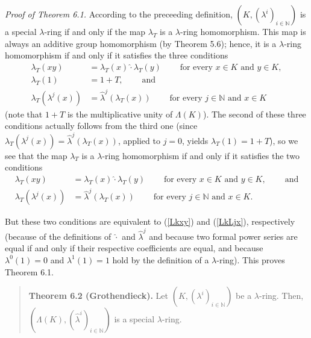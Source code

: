 \documentclass[12pt,final,notitlepage,onecolumn,german]{article}%
\begin{document}
\textit{Proof of Theorem 6.1.} According to the preceeding definition,
$\left(  K,\left(  \lambda^{i}\right)  _{i\in\mathbb{N}}\right)  $ is a
special $\lambda$-ring if and only if the map $\lambda_{T}$ is a $\lambda
$-ring homomorphism. This map is always an additive group homomorphism (by
Theorem 5.6); hence, it is a $\lambda$-ring homomorphism if and only if it
satisfies the three conditions%
\begin{align*}
\lambda_{T}\left(  xy\right)   &  =\lambda_{T}\left(  x\right)  \widehat
{\cdot}\lambda_{T}\left(  y\right)  \ \ \ \ \ \ \ \ \ \ \text{for every }x\in
K\text{ and }y\in K,\\
\lambda_{T}\left(  1\right)   &  =1+T,\ \ \ \ \ \ \ \ \ \ \text{and}\\
\lambda_{T}\left(  \lambda^{j}\left(  x\right)  \right)   &  =\widehat
{\lambda}^{j}\left(  \lambda_{T}\left(  x\right)  \right)
\ \ \ \ \ \ \ \ \ \ \text{for every }j\in\mathbb{N}\text{ and }x\in K
\end{align*}
(note that $1+T$ is the multiplicative unity of $\Lambda\left(  K\right)  $).
The second of these three conditions actually follows from the third one
(since $\lambda_{T}\left(  \lambda^{j}\left(  x\right)  \right)
=\widehat{\lambda}^{j}\left(  \lambda_{T}\left(  x\right)  \right)  $, applied
to $j=0$, yields $\lambda_{T}\left(  1\right)  =1+T$), so we see that the map
$\lambda_{T}$ is a $\lambda$-ring homomorphism if and only if it satisfies the
two conditions%
\begin{align*}
\lambda_{T}\left(  xy\right)   &  =\lambda_{T}\left(  x\right)  \widehat
{\cdot}\lambda_{T}\left(  y\right)  \ \ \ \ \ \ \ \ \ \ \text{for every }x\in
K\text{ and }y\in K,\ \ \ \ \ \ \ \ \ \ \text{and}\\
\lambda_{T}\left(  \lambda^{j}\left(  x\right)  \right)   &  =\widehat
{\lambda}^{j}\left(  \lambda_{T}\left(  x\right)  \right)
\ \ \ \ \ \ \ \ \ \ \text{for every }j\in\mathbb{N}\text{ and }x\in K.
\end{align*}


But these two conditions are equivalent to (\ref{Lkxy}) and (\ref{LkLjx}),
respectively (because of the definitions of $\widehat{\cdot}$ and
$\widehat{\lambda}^{j}$ and because two formal power series are equal if and
only if their respective coefficients are equal, and because $\lambda
^{0}\left(  1\right)  =0$ and $\lambda^{1}\left(  1\right)  =1$ hold by the
definition of a $\lambda$-ring). This proves Theorem 6.1.

\begin{quote}
\textbf{Theorem 6.2 (Grothendieck).} Let $\left(  K,\left(  \lambda
^{i}\right)  _{i\in\mathbb{N}}\right)  $ be a $\lambda$-ring. Then, $\left(
\Lambda\left(  K\right)  ,\left(  \widehat{\lambda}^{i}\right)  _{i\in
\mathbb{N}}\right)  $ is a special $\lambda$-ring.
\end{quote}
\end{document}
